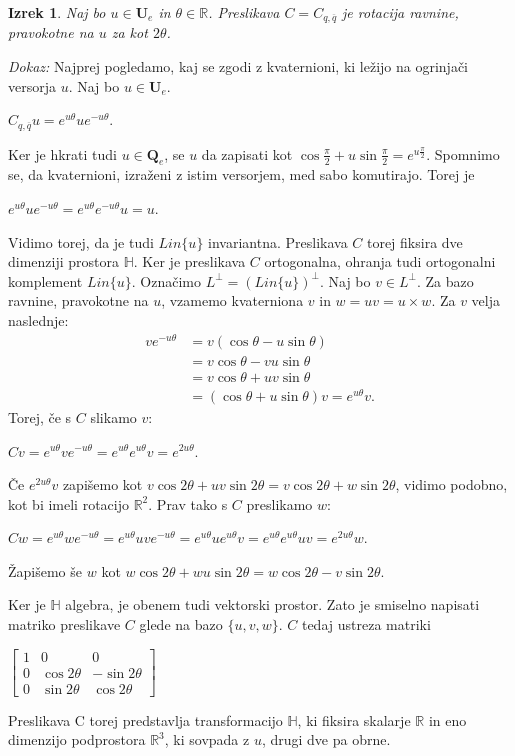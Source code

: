 \documentclass[a4paper,12pt]{article}
\def\R{\mathbb{R}} %
\def\H{\mathbb{H}} %
\def\Qe{\textbf{Q}_{e}} %
\def\Ue{\textbf{U}_{e}} %
\newcommand{\conj}[1]{\overline{#1}}
\newtheorem{izrek}{Izrek}
\begin{document}
\begin{izrek}
Naj bo $u \in \Ue$ in $\theta \in \R$. Preslikava $C = C_{q, \conj{q}}$ je rotacija ravnine, 
pravokotne na $u$ za kot $2\theta$.
\end{izrek}
\break
\noindent
{\em Dokaz:\/} Najprej pogledamo, kaj se zgodi z kvaternioni, ki ležijo na ogrinjači versorja $u$.
Naj bo $u \in \Ue$.
\begin{center}
   $C_{q,\conj{q}}u = e^{u\theta} u e^{-u\theta}$.
\end{center}
Ker je hkrati tudi $u \in \Qe$, se $u$ da zapisati kot $\cos\frac{\pi}{2} + u\sin\frac{\pi}{2} = e^{u\frac{\pi}{2}}$.
Spomnimo se, da kvaternioni, izraženi z istim versorjem, med sabo komutirajo. Torej je
\begin{center}
   $e^{u\theta} u e^{-u\theta} = e^{u\theta}e^{-u\theta}u = u$.
\end{center}
Vidimo torej, da je tudi $Lin\{u\}$ invariantna. Preslikava $C$ torej fiksira dve dimenziji prostora $\H$.
Ker je preslikava $C$ ortogonalna, ohranja tudi ortogonalni komplement $Lin\{u\}$.
Označimo $L^{\bot} = (Lin\{u\})^{\bot}$. Naj bo $v \in L^{\bot}$. Za bazo ravnine, pravokotne na $u$, vzamemo kvaterniona $v$ in $w = uv = u \times w$.
Za $v$ velja naslednje:
\begin{align*}
   v e^{-u\theta} & = v(\cos\theta -u\sin\theta) \\
   & = v\cos\theta -vu \sin\theta \\
   & = v\cos\theta + uv\sin\theta \\
   & = (\cos\theta +u\sin\theta)v = e^{u\theta}v.
\end{align*}
Torej, če s $C$ slikamo $v$:
\begin{center}
   $Cv = e^{u\theta}v e^{-u\theta} = e^{u\theta}e^{u\theta}v = e^{2u\theta}$.
\end{center}
Če $e^{2u\theta}v$ zapišemo kot $v\cos2\theta + uv\sin2\theta = v\cos2\theta + w\sin2\theta$, vidimo podobno, kot bi imeli rotacijo $\R^2$. Prav tako s $C$ preslikamo $w$:
\begin{center}
   $Cw = e^{u\theta}w e^{-u\theta} = e^{u\theta}uve^{-u\theta} = e^{u\theta}ue^{u\theta}v = e^{u\theta}e^{u\theta}uv = e^{2u\theta}w$.
\end{center}
Žapišemo še $w$ kot $w\cos2\theta + wu\sin2\theta = w\cos2\theta - v\sin2\theta$.

Ker je $\H$ algebra, je obenem tudi vektorski prostor. Zato je smiselno napisati matriko preslikave $C$ glede na bazo $\{u, v, w\}$.
$C$ tedaj ustreza matriki
\begin{center}
   $
   \begin{bmatrix}
      1 & 0 & 0 \\
      0 & \cos2\theta & -\sin2\theta \\
      0 & \sin2\theta & \cos2\theta
   \end{bmatrix}
   $
\end{center}
Preslikava C torej predstavlja transformacijo $\H$, ki fiksira skalarje $\R$ in eno dimenzijo podprostora $\R^3$, ki sovpada z $u$, drugi dve pa obrne.
\end{document}
